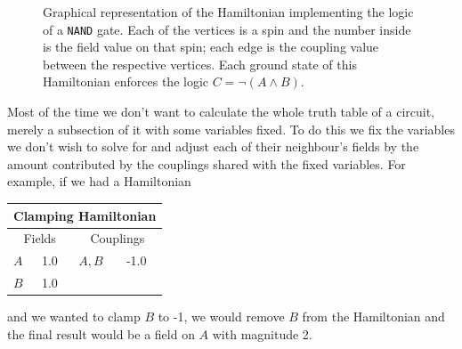 \begin{figure}
	\begin{center}
	\end{center}
	\caption[\texttt{NAND} Graph]{Graphical representation of the Hamiltonian implementing the logic of a \texttt{NAND} gate.  Each of the vertices is a spin and the number inside is the field value on that spin; each edge is the coupling value between the respective vertices.  Each ground state of this Hamiltonian enforces the logic $C = \neg(A \wedge B)$.}
	\label{fig:nand_graph}
\end{figure}

Most of the time we don't want to calculate the whole truth table of a circuit, merely a subsection of it with some variables fixed.  To do this we fix the variables we don't wish to solve for and adjust each of their neighbour's fields by the amount contributed by the couplings shared with the fixed variables.  For example, if we had a Hamiltonian 

\begin{center}
\begin{tabular}{ | l | l | l | l |}
	\hline
	\multicolumn{4}{|c|}{Clamping Hamiltonian} \\ \hline
	\multicolumn{2}{|c|}{Fields} & \multicolumn{2}{c|}{Couplings} \\ \hline
	$A$ & 1.0 & $A,B$ & -1.0 \\
	$B$ & 1.0 &  &  \\ \hline
\end{tabular}
\end{center}

and we wanted to clamp $B$ to -1, we would remove $B$ from the Hamiltonian and the final result would be a field on $A$ with magnitude 2.

